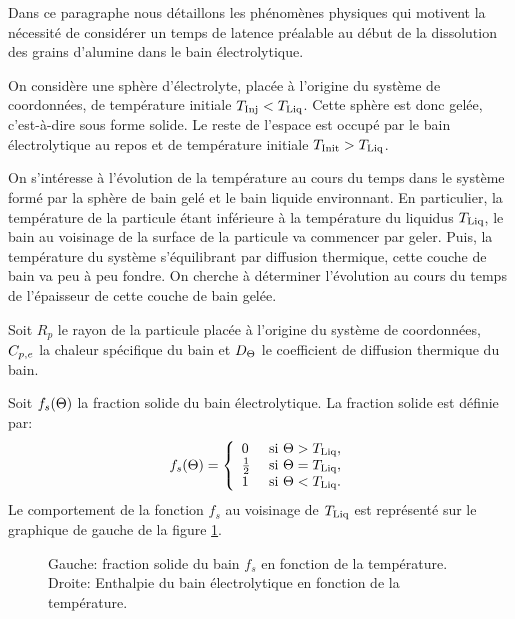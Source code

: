 Dans ce paragraphe nous détaillons les phénomènes physiques qui
motivent la nécessité de considérer un temps de latence
préalable au début de la dissolution des grains d'alumine dans le
bain électrolytique.

On considère une sphère d'électrolyte, placée à l'origine du
système de coordonnées, de température initiale $T_\text{Inj}<T_\text{Liq}$. Cette
sphère est donc gelée, c'est-à-dire sous forme solide. Le reste de
l'espace est occupé par le bain électrolytique au repos et de
température initiale $T_\text{Init} > T_\text{Liq}$.

On s'intéresse à l'évolution de la température au cours du
temps dans le système formé par la sphère de bain gelé et le
bain liquide environnant. En particulier, la température de la
particule étant inférieure à la température du liquidus
$T_\text{Liq}$, le bain au voisinage de la surface de la particule va
commencer par geler. Puis, la température du système s'équilibrant par
diffusion thermique, cette couche de bain va peu à peu fondre. On
cherche à déterminer l'évolution au cours du temps de l'épaisseur de
cette couche de bain gelée.

Soit $R_p$ le rayon de la particule placée à l'origine du
système de coordonnées, $C_{p,e}$ la chaleur spécifique du bain et
$D_\Theta$ le coefficient de diffusion thermique du bain.

Soit $f_s(\Theta)$ la fraction solide du bain électrolytique. La
fraction solide est définie par:
\begin{equation}
  f_s(\Theta) = \left\{
  \begin{array}{ll}
    0           & \text{ si } \Theta > T_\text{Liq},\\
    \frac{1}{2} & \text{ si } \Theta = T_\text{Liq},\\
    1           & \text{ si } \Theta < T_\text{Liq}.
  \end{array}
  \right.
\end{equation}
Le comportement de la fonction $f_s$ au voisinage de $T_\text{Liq}$ est
représenté sur le graphique de gauche de la figure
\ref{fig:solid-fraction-enthalpy}.

\begin{figure}
  \begin{center}
    
    
    \caption{Gauche: fraction solide du bain $f_s$ en fonction de la
      température. Droite: Enthalpie du bain électrolytique en
      fonction de la température.}
    \label{fig:solid-fraction-enthalpy}
  \end{center}
\end{figure}

